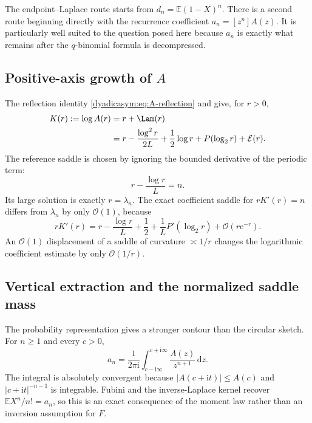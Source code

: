 \documentclass[11pt,oneside]{article}
\theoremstyle{definition}
\theoremstyle{remark}
\newcommand{\e}{\mathrm e}
\newcommand{\ii}{\mathrm i}
\newcommand{\dd}{\,\mathrm d}
\newcommand{\E}{\mathbb E}
\newcommand{\bigO}{\mathcal O}
\begin{document}
The endpoint--Laplace route starts from $d_n=\E(1-X)^n$.  There is a second route beginning
directly with the recurrence coefficient $a_n=[z^n]A(z)$.  It is particularly well suited to
the question posed here because $a_n$ is exactly what remains after the $q$-binomial formula
is decompressed.

\subsection{Positive-axis growth of \texorpdfstring{$A$}{A}}

The reflection identity \eqref{dyadicasym:eq:A-reflection} and
 give, for $r>0$,
\begin{align}
 K(r):=\log A(r)
 ={}&r+\Lam(r)                                               \notag\\
 ={}&r-\frac{\log^2r}{2L}+\frac12\log r
 +P(\log_2r)+\mathcal E(r).                                \label{dyadicasym:eq:K-positive}
\end{align}
The reference saddle is chosen by ignoring the bounded derivative of the periodic term:
\begin{equation}
 r-\frac{\log r}{L}=n.                                      \label{dyadicasym:eq:reference-saddle}
\end{equation}
Its large solution is exactly $r=\lambda_n$.  The exact coefficient saddle for
$rK'(r)=n$ differs from $\lambda_n$ by only $\bigO(1)$, because
\begin{equation}
 rK'(r)=r-\frac{\log r}{L}+\frac12+\frac1L P'(\log_2r)
 +\bigO(r\e^{-r}).                                          \label{dyadicasym:eq:exact-saddle-shift}
\end{equation}
An $\bigO(1)$ displacement of a saddle of curvature $\asymp1/r$ changes the logarithmic
coefficient estimate by only $\bigO(1/r)$.

\subsection{Vertical extraction and the normalized saddle mass}

The probability representation gives a stronger contour than the circular sketch.  For
$n\ge1$ and every $c>0$,
\begin{equation}
 a_n=\frac1{2\pi\ii}\int_{c-\ii\infty}^{c+\ii\infty}
 \frac{A(z)}{z^{n+1}}\dd z.                               \label{dyadicasym:eq:vertical-extraction}
\end{equation}
The integral is absolutely convergent because
$|A(c+\ii t)|\le A(c)$ and $|c+\ii t|^{-n-1}$ is integrable.  Fubini and the
inverse-Laplace kernel recover $\E X^n/n!=a_n$, so this is an exact consequence of the
moment law rather than an inversion assumption for $F$.
\end{document}
